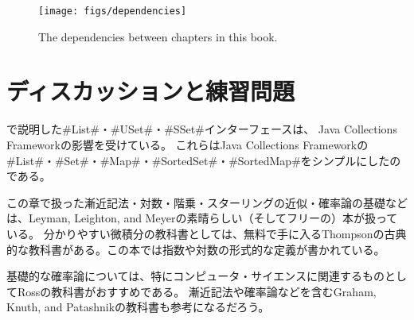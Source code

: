 \begin{figure}
  \begin{center}
    \texttt{[image: figs/dependencies]}
  \end{center}
  \caption{The dependencies between chapters in this book.}
\end{figure}

\section{ディスカッションと練習問題}

で説明した#List#・#USet#・#SSet#インターフェースは、 Java Collections Framework\cite{oracle_collections}の影響を受けている。
%
これらはJava Collections Frameworkの#List#・#Set#・#Map#・#SortedSet#・#SortedMap#をシンプルにしたのである。

この章で扱った漸近記法・対数・階乗・スターリングの近似・確率論の基礎などは、Leyman, Leighton, and Meyer\cite{llm11}の素晴らしい（そしてフリーの）本が扱っている。
分かりやすい微積分の教科書としては、無料で手に入るThompson\cite{t14}の古典的な教科書がある。この本では指数や対数の形式的な定義が書かれている。

基礎的な確率論については、特にコンピュータ・サイエンスに関連するものとしてRoss\cite{r01}の教科書がおすすめである。
漸近記法や確率論などを含むGraham, Knuth, and Patashnik\cite{gkp94}の教科書も参考になるだろう。

